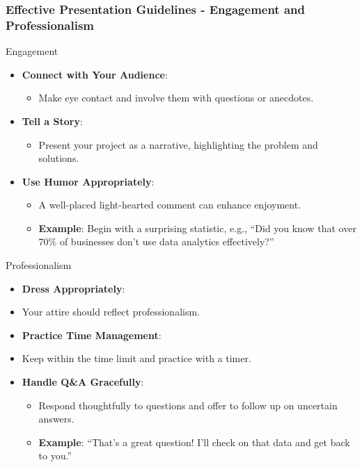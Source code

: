 \documentclass[aspectratio=169]{beamer}
\begin{document}
\begin{frame}[fragile]
    \frametitle{Effective Presentation Guidelines - Engagement and Professionalism}
    \begin{block}{Engagement}
        \begin{itemize}
            \item \textbf{Connect with Your Audience}:
            \begin{itemize}
                \item Make eye contact and involve them with questions or anecdotes.
            \end{itemize}
            \item \textbf{Tell a Story}:
            \begin{itemize}
                \item Present your project as a narrative, highlighting the problem and solutions.
            \end{itemize}
            \item \textbf{Use Humor Appropriately}:
            \begin{itemize}
                \item A well-placed light-hearted comment can enhance enjoyment.
                \item \textbf{Example}: Begin with a surprising statistic, e.g., “Did you know that over 70\% of businesses don’t use data analytics effectively?”
            \end{itemize}
        \end{itemize}
    \end{block}
    
    \begin{block}{Professionalism}
        \begin{itemize}
            \item \textbf{Dress Appropriately}:
            \item Your attire should reflect professionalism.
            \item \textbf{Practice Time Management}:
            \item Keep within the time limit and practice with a timer.
            \item \textbf{Handle Q\&A Gracefully}:
            \begin{itemize}
                \item Respond thoughtfully to questions and offer to follow up on uncertain answers.
                \item \textbf{Example}: “That’s a great question! I’ll check on that data and get back to you.”
            \end{itemize}
        \end{itemize}
    \end{block}
\end{frame}
\end{document}
